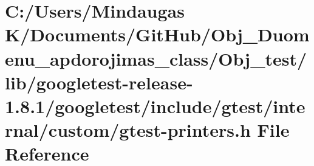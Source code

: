 \hypertarget{_obj__test_2lib_2googletest-release-1_88_81_2googletest_2include_2gtest_2internal_2custom_2gtest-printers_8h}{}\section{C\+:/\+Users/\+Mindaugas K/\+Documents/\+Git\+Hub/\+Obj\+\_\+\+Duomenu\+\_\+apdorojimas\+\_\+class/\+Obj\+\_\+test/lib/googletest-\/release-\/1.8.1/googletest/include/gtest/internal/custom/gtest-\/printers.h File Reference}
\label{_obj__test_2lib_2googletest-release-1_88_81_2googletest_2include_2gtest_2internal_2custom_2gtest-printers_8h}
